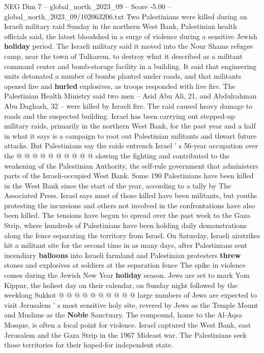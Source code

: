 \begin{textsample}{NEG Dim 7 – global\_north\_2023\_09 – Score -5.00 – global\_north\_2023\_09/102063206.txt}  \label{ex:f7_neg_162}
Two Palestinians were killed during an Israeli military raid Sunday in the northern West Bank, Palestinian health officials said, the latest bloodshed in a surge of violence during a sensitive Jewish \textbf{holiday} period.
The Israeli military said it moved into the Nour Shams refugee camp, near the town of Tulkarem, to destroy what it described as a militant command center and bomb-storage facility in a building.
It said that engineering units detonated a number of bombs planted under roads, and that militants opened fire and \textbf{hurled} explosives, as troops responded with live fire.
The Palestinian Health Ministry said two men -- Asid Abu Ali, 21, and Abdulrahman Abu Daghash, 32 -- were killed by Israeli fire.
The raid caused heavy damage to roads and the suspected building.
Israel has been carrying out stepped-up military raids, primarily in the northern West Bank, for the past year and a half in what it says is a campaign to root out Palestinian militants and thwart future attacks.
But Palestinians say the raids entrench Israel ' s 56-year occupation over the @ @ @ @ @ @ @ @ @ @ slowing the fighting and contributed to the weakening of the Palestinian Authority, the self-rule government that administers parts of the Israeli-occupied West Bank.
Some 190 Palestinians have been killed in the West Bank since the start of the year, according to a tally by The Associated Press.
Israel says most of those killed have been militants, but youths protesting the incursions and others not involved in the confrontations have also been killed.
The tensions have begun to spread over the past week to the Gaza Strip, where hundreds of Palestinians have been holding daily demonstrations along the fence separating the territory from Israel.
On Saturday, Israeli airstrikes hit a militant site for the second time in as many days, after Palestinians sent incendiary \textbf{balloons} into Israeli farmland and Palestinian protesters \textbf{threw} stones and explosives at soldiers at the separation fence The spike in violence comes during the Jewish New Year \textbf{holiday} season.
Jews are set to mark Yom Kippur, the holiest day on their calendar, on Sunday night followed by the weeklong Sukkot @ @ @ @ @ @ @ @ @ @ large numbers of Jews are expected to visit Jerusalem ' s most sensitive holy site, revered by Jews as the Temple Mount and Muslims as the \textbf{Noble} Sanctuary.
The compound, home to the Al-Aqsa Mosque, is often a focal point for violence.
Israel captured the West Bank, east Jerusalem and the Gaza Strip in the 1967 Mideast war.
The Palestinians seek those territories for their hoped-for independent state.

\end{textsample}
